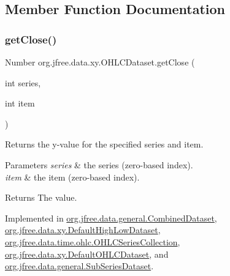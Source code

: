 \subsection{Member Function Documentation}
\mbox{\label{interfaceorg_1_1jfree_1_1data_1_1xy_1_1_o_h_l_c_dataset_a7c84699d1c3f6d5b4d1378d7b23d49ac}} 
\subsubsection{\texorpdfstring{get\+Close()}{getClose()}}
{\footnotesize\ttfamily Number org.\+jfree.\+data.\+xy.\+O\+H\+L\+C\+Dataset.\+get\+Close (\begin{DoxyParamCaption}\item[{int}]{series,  }\item[{int}]{item }\end{DoxyParamCaption})}

Returns the y-\/value for the specified series and item.


\begin{DoxyParams}{Parameters}
{\em series} & the series (zero-\/based index). \\
\hline
{\em item} & the item (zero-\/based index).\\
\hline
\end{DoxyParams}
\begin{DoxyReturn}{Returns}
The value. 
\end{DoxyReturn}


Implemented in \mbox{\hyperlink{classorg_1_1jfree_1_1data_1_1general_1_1_combined_dataset_a7f58c968f7c5b50b3e122c49f5d33069}{org.\+jfree.\+data.\+general.\+Combined\+Dataset}}, \mbox{\hyperlink{classorg_1_1jfree_1_1data_1_1xy_1_1_default_high_low_dataset_a12694885b103c14192fea35616c464f9}{org.\+jfree.\+data.\+xy.\+Default\+High\+Low\+Dataset}}, \mbox{\hyperlink{classorg_1_1jfree_1_1data_1_1time_1_1ohlc_1_1_o_h_l_c_series_collection_a6746247a2fcb824cfdcde9dff7d83d13}{org.\+jfree.\+data.\+time.\+ohlc.\+O\+H\+L\+C\+Series\+Collection}}, \mbox{\hyperlink{classorg_1_1jfree_1_1data_1_1xy_1_1_default_o_h_l_c_dataset_afca93f709f3d421a3d57b67e00357b03}{org.\+jfree.\+data.\+xy.\+Default\+O\+H\+L\+C\+Dataset}}, and \mbox{\hyperlink{classorg_1_1jfree_1_1data_1_1general_1_1_sub_series_dataset_a0811cf5e7e6b2e05cd783980f1c17703}{org.\+jfree.\+data.\+general.\+Sub\+Series\+Dataset}}.

